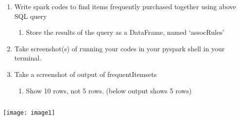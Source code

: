\documentclass[]{article}
\begin{document}
\begin{enumerate}[before=\itshape,label=\arabic*.]
	\item Write spark codes to find items frequently purchased together using above SQL query
	\begin{enumerate}[before=\itshape,label=\alph*.]
		\item Store the results of the query as a DataFrame, named ‘assocRules’
	\end{enumerate}
	\item Take screenshot(s) of running your codes in your pyspark shell in your terminal.
	\item Take a screenshot of output of frequentItemsets
	\begin{enumerate}[before=\itshape,label=\alph*.]
		\item Show 10 rows, not 5 rows. (below output shows 5 rows)
	\end{enumerate}
\end{enumerate} 

\begin{verbatim}

\end{verbatim}
\texttt{[image: image1]}
\end{document}
